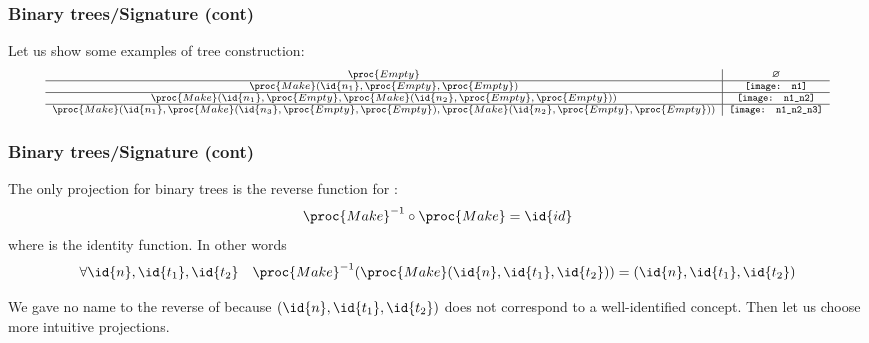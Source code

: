%
\begin{frame}
\frametitle{Binary trees/Signature (cont)}

Let us show some examples of tree construction:
\[
{\scriptsize
\begin{array}{c|c}
  \proc{Empty} 
& \varnothing\\
\hline
  \proc{Make} (\id{n_1}, \proc{Empty}, \proc{Empty})
& \texttt{[image: n1]}\\%
\hline
  \proc{Make} (\id{n_1}, \proc{Empty}, \proc{Make} (\id{n_2},
  \proc{Empty}, \proc{Empty}))
& \texttt{[image: n1\_n2]}\\%
\hline
  \proc{Make} (\id{n_1}, \proc{Make} (\id{n_3},
  \proc{Empty}, \proc{Empty}), \proc{Make} (\id{n_2},
  \proc{Empty}, \proc{Empty}))
& \texttt{[image: n1\_n2\_n3]}
\end{array}
}
\]

\end{frame}

%
\begin{frame}
\frametitle{Binary trees/Signature (cont)}

The only projection for binary trees is the reverse function for
: \[\proc{Make}^{-1} \circ \proc{Make} = \id{id}\] where
 is the identity function. In other words \[\forall \id{n},
\id{t_1}, \id{t_2} \quad \proc{Make}^{-1} (\proc{Make} (\id{n},
\id{t_1}, \id{t_2})) = (\id{n}, \id{t_1}, \id{t_2})\]

We gave no name to the reverse of  because \((\id{n},
\id{t_1}, \id{t_2})\) does not correspond to a well-identified
concept. Then let us choose more intuitive projections.

\end{frame}


